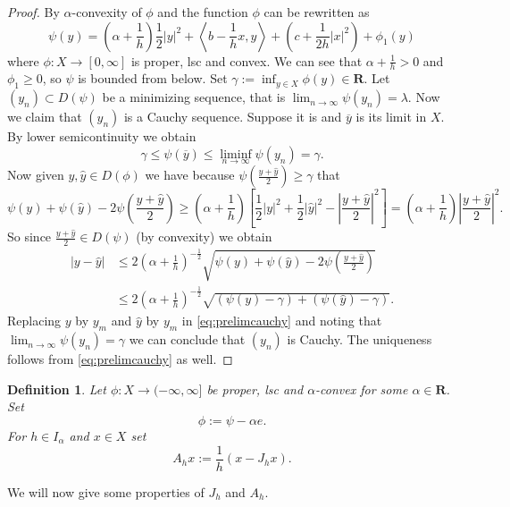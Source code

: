 \documentclass[a4paper,11pt, leqno]{scrreprt} %
\renewcommand{\leq}{\leqslant}
\renewcommand{\leq}{\leqslant}
\renewcommand{\geq}{\geqslant}
\newcommand{\R}{\mathbf R}
\theoremstyle{change}
\newcounter{acounter}[chapter]
\newtheorem{definition}[acounter]{Definition}
\theoremstyle{nonumberplain}
\newtheorem{proof}{Proof}
\begin{document}
\begin{proof}
By $\alpha$-convexity of $\phi$ and  the function
$\phi$ can be rewritten as
\begin{equation}
\psi(y) = \left ( \alpha + \frac1h \right ) \frac12 |y|^2 + \left
  \langle b - \frac1h x, y \right \rangle + \left ( c + \frac1{2h}
  |x|^2 \right ) + \phi_1(y)
\end{equation}
where $\phi: X \to [0, \infty]$ is proper, lsc and convex. We can see
that $\alpha + \frac1h > 0$ and $\phi_1 \geq 0$, so $\psi$ is bounded
from below. Set $\gamma := \inf_{y \in X} \phi(y) \in \R$. Let
$(y_n) \subset D(\psi)$ be a minimizing sequence, that is $\lim_{n \to
  \infty} \psi(y_n) = \lambda$. Now we claim that $(y_n)$ is a Cauchy
sequence. Suppose it is and $\overline{y}$ is its limit in $X$. By
lower semicontinuity we obtain
\begin{equation*}
\gamma \leq \psi(\overline{y}) \leq \liminf_{n \to \infty} \psi(y_n)
= \gamma.
\end{equation*}
Now given $y, \hat{y} \in D(\phi)$ we have because $\psi \left (
  \frac{y + \hat{y}}{2} \right ) \geq \gamma$ that
\[
\psi(y) + \psi(\hat{y}) - 2 \psi \left ( \frac{y + \hat{y}}{2} \right
) \geq \left ( \alpha + \frac1h \right ) \left [ \frac12 |y|^2 +
  \frac12 |\hat y|^2 - \left | \frac{y + \hat y}{2} \right |^2 \right
] = \left ( \alpha + \frac1h \right ) \left | \frac{y + \hat y}{2}
\right |^2.
\]
So since $\frac{y + \hat y}{2} \in D(\psi)$ (by convexity) we obtain
\begin{equation}\label{eq:prelimcauchy}
\begin{split}
|y - \hat y| &\leq 2 \left (\alpha + \frac1h \right )^{-\frac12}
\sqrt{\psi(y) + \psi(\hat y) - 2 \psi \left ( \frac{y + \hat y}{2}
  \right )}\\
&\leq  2 \left (\alpha + \frac1h \right )^{-\frac12}
\sqrt{(\psi(y) - \gamma) + (\psi(\hat y) -\gamma)}.
\end{split}
\end{equation}
Replacing $y$ by $y_m$ and $\hat y$ by $y_m$ in
\eqref{eq:prelimcauchy} and noting that $\lim_{n \to \infty} \psi(y_n)
= \gamma$ we can conclude that $(y_n)$ is Cauchy. The uniqueness
follows from \eqref{eq:prelimcauchy} as well.
\end{proof}

\begin{definition}
Let $\phi : X \to (-\infty, \infty]$ be proper, lsc and
$\alpha$-convex for some $\alpha \in \R$. Set
\begin{equation}
\phi := \psi - \alpha e.
\end{equation}
For $h \in I_\alpha$ and $x \in X$ set
\begin{equation}
A_h x := \frac1h (x - J_h x).
\end{equation}
\end{definition}
We will now give some properties of $J_h$ and $A_h$.
\end{document}
